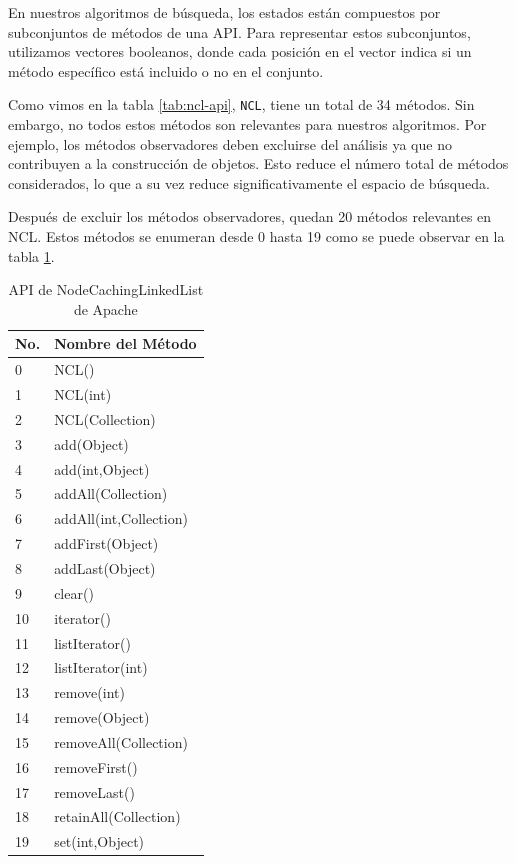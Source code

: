 En nuestros algoritmos de búsqueda, los estados están compuestos por subconjuntos de métodos de una API. Para representar estos subconjuntos, utilizamos vectores booleanos, donde cada posición en el vector indica si un método específico está incluido o no en el conjunto.

Como vimos en la tabla \ref{tab:ncl-api}, \texttt{NCL}, tiene un total de 34 métodos. Sin embargo, no todos estos métodos son relevantes para nuestros algoritmos. Por ejemplo, los métodos observadores deben excluirse del análisis ya que no contribuyen a la construcción de objetos. Esto reduce el número total de métodos considerados, lo que a su vez reduce significativamente el espacio de búsqueda.

Después de excluir los métodos observadores, quedan 20 métodos relevantes en NCL. Estos métodos se enumeran desde 0 hasta 19 como se puede observar en la tabla \ref{tab:ncl-api-infer}. 
\begin{table}[h!]
\centering
{\scriptsize
\begin{tabular}{|l|l|}
\hline
No. & Nombre del Método \\
\hline
0 & NCL() \\
1 & NCL(int) \\
2 & NCL(Collection) \\
3 & add(Object) \\
4 & add(int,Object) \\
5 & addAll(Collection) \\
6 & addAll(int,Collection) \\
7 & addFirst(Object) \\
8 & addLast(Object) \\
9 & clear() \\
10 & iterator() \\
11 & listIterator() \\
12 & listIterator(int) \\
13 & remove(int) \\
14 & remove(Object) \\
15 & removeAll(Collection) \\
16 & removeFirst() \\
17 & removeLast() \\
18 & retainAll(Collection) \\
19 & set(int,Object) \\
\hline
\end{tabular}
}
\caption{API de NodeCachingLinkedList de Apache}
\label{tab:ncl-api-infer}
\end{table}


